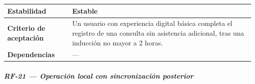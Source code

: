 \documentclass[
]{article}
\begin{document}
{\begin{longtable}[]{|
  >{\raggedright\arraybackslash}p{}|
  >{\raggedright\arraybackslash}p{}|}
\hline
\textbf{Estabilidad} & \begin{minipage}[t]{\linewidth}\raggedright
Estable
\end{minipage} \\
\hline
\textbf{Criterio de aceptación} &
\begin{minipage}[t]{\linewidth}\raggedright
Un usuario con experiencia digital básica completa el registro de una consulta sin asistencia adicional, tras una inducción no mayor a 2 horas.
\end{minipage} \\
\hline
\textbf{Dependencias} & \begin{minipage}[t]{\linewidth}\raggedright
—
\end{minipage} \\
\hline
\end{longtable}
}

\subparagraph{RF-21 --- Operación local con sincronización posterior}\label{rf-21-operaci-n-local-con-sincronizaci-n-poste}
\end{document}
